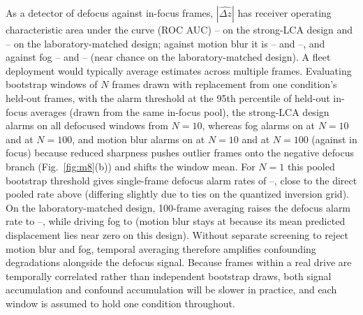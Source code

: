 \documentclass{ieee-ojvt}
\begin{document}
As a detector of defocus against in-focus frames, $|\widehat{\Delta z}|$ has receiver operating characteristic area under the curve (ROC AUC) \MeightAucStrongFocusMin--\MeightAucStrongFocusMax{} on the strong-LCA design and \MeightAucWeakFocusMin--\MeightAucWeakFocusMax{} on the laboratory-matched design; against motion blur it is \MeightAucStrongMotionMin--\MeightAucStrongMotionMax{} and \MeightAucWeakMotionMin--\MeightAucWeakMotionMax, and against fog \MeightAucStrongFogMin--\MeightAucStrongFogMax{} and \MeightAucWeakFogMin--\MeightAucWeakFogMax{} (near chance on the laboratory-matched design). A fleet deployment would typically average estimates across multiple frames. Evaluating bootstrap windows of $N$ frames drawn with replacement from one condition's held-out frames, with the alarm threshold at the 95th percentile of held-out in-focus averages (drawn from the same in-focus pool), the strong-LCA design alarms on all defocused windows from $N=10$, whereas fog alarms on \MeightAggStrongTenFog{} at $N=10$ and \MeightAggStrongHundredFog{} at $N=100$, and motion blur alarms on \MeightAggStrongTenMotion{} at $N=10$ and \MeightAggStrongHundredMotion{} at $N=100$ (against \MeightAggStrongHundredFocus{} in focus) because reduced sharpness pushes outlier frames onto the negative defocus branch (Fig.~\ref{fig:m8}(b)) and shifts the window mean. For $N=1$ this pooled bootstrap threshold gives single-frame defocus alarm rates of \MeightAggStrongOneDefocus--\MeightAggStrongOneDefocusMax, close to the direct pooled rate above (differing slightly due to ties on the quantized inversion grid). On the laboratory-matched design, 100-frame averaging raises the defocus alarm rate to \MeightAggWeakHundredDefocus--\MeightAggWeakHundredDefocusMax{}, while driving fog to \MeightAggWeakHundredFog{} (motion blur stays at \MeightAggWeakHundredMotion{} because its mean predicted displacement lies near zero on this design). Without separate screening to reject motion blur and fog, temporal averaging therefore amplifies confounding degradations alongside the defocus signal. Because frames within a real drive are temporally correlated rather than independent bootstrap draws, both signal accumulation and confound accumulation will be slower in practice, and each window is assumed to hold one condition throughout.
\end{document}

